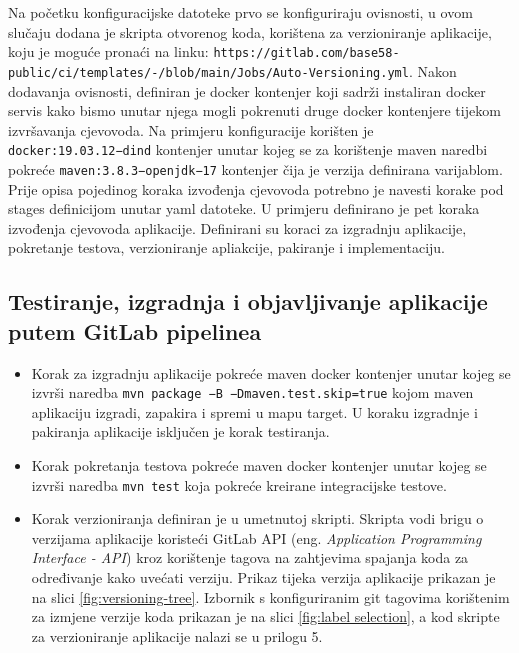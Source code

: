 \documentclass[a4paper,12pt,oneside]{article}
\begin{document}
Na početku konfiguracijske datoteke prvo se konfiguriraju ovisnosti, u ovom slučaju dodana je skripta otvorenog koda, korištena za verzioniranje aplikacije, koju je moguće pronaći na linku: \texttt{https://gitlab.com/base58-public/ci/templates/-/blob/main/Jobs\-/Auto-Versioning.yml}. Nakon dodavanja ovisnosti, definiran je docker kontenjer koji sadrži instaliran docker servis kako bismo unutar njega mogli pokrenuti druge docker kontenjere tijekom izvršavanja cjevovoda. Na primjeru konfiguracije korišten je \texttt{docker:19.03.12−dind} kontenjer unutar kojeg se za korištenje maven naredbi pokreće \texttt{maven:3.8.3−openjdk−17} kontenjer čija je verzija definirana varijablom. Prije opisa pojedinog koraka izvođenja cjevovoda potrebno je navesti korake pod stages definicijom unutar yaml datoteke. U primjeru definirano je pet koraka izvođenja cjevovoda aplikacije. Definirani su koraci za izgradnju aplikacije, pokretanje testova, verzioniranje apliakcije, pakiranje i implementaciju. 


\subsection{Testiranje, izgradnja i objavljivanje aplikacije putem GitLab pipelinea}

\begin{itemize}

\item Korak za izgradnju aplikacije pokreće maven docker kontenjer unutar kojeg se izvrši naredba \texttt{mvn package −B −Dmaven.test.skip=true} kojom maven aplikaciju izgradi, zapakira i spremi u mapu target. U koraku izgradnje i pakiranja aplikacije isključen je korak testiranja.

\item Korak pokretanja testova pokreće maven docker kontenjer unutar kojeg se izvrši naredba \texttt{mvn test} koja pokreće kreirane integracijske testove.

\item Korak verzioniranja definiran je u umetnutoj skripti. Skripta vodi brigu o verzijama aplikacije koristeći GitLab API (eng. \textit{Application Programming Interface - API}) kroz korištenje tagova na zahtjevima spajanja koda za određivanje kako uvećati verziju. Prikaz tijeka verzija aplikacije prikazan je na slici \ref{fig:versioning-tree}. Izbornik s konfiguriranim git tagovima korištenim za izmjene verzije koda prikazan je na slici \ref{fig:label selection}, a kod skripte za verzioniranje aplikacije nalazi se u prilogu 5.
\end{itemize}
\end{document}
